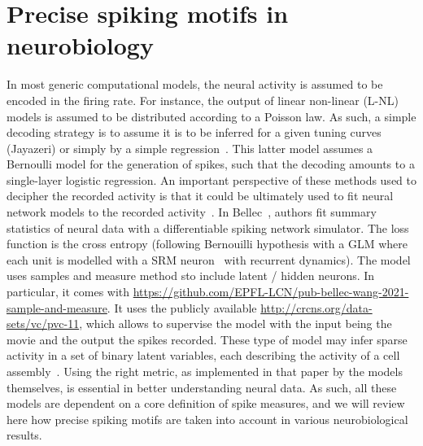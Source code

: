\documentclass[brainsci, %
               review,submit,pdftex,moreauthors
               ]{Definitions/mdpi}
\begin{document}
 \section{Precise spiking motifs in neurobiology}
%
In most generic computational models, the neural activity is assumed to be encoded in the firing rate. For instance, the output of linear non-linear (L-NL) models is assumed to be distributed according to a Poisson law. As such, a simple decoding strategy is to assume it is to be inferred for a given tuning curves (Jayazeri) or simply by a simple regression~\citep{berens_fast_2012}. This latter model assumes a Bernoulli model for the generation of spikes, such that the decoding amounts to a single-layer logistic regression. An important perspective of these methods used to decipher the recorded activity is that it could be ultimately used to fit neural network models to the recorded activity~\citep{bellec_fitting_2021}. In Bellec~\citet{bellec_fitting_2021}, authors fit summary statistics of neural data with a differentiable spiking network simulator. The loss function is the cross entropy (following Bernouilli hypothesis with a GLM where each unit is modelled with a SRM neuron~\citep{gerstner_time_1995} with recurrent dynamics). The model uses samples and measure method sto include latent / hidden neurons. In particular, it comes with  \href{code}{https://github.com/EPFL-LCN/pub-bellec-wang-2021-sample-and-measure}. It uses the publicly available \href{V1-dataset}{http://crcns.org/data-sets/vc/pvc-11}, which allows to supervise the model with the input being the movie and the output the spikes recorded. These type of model may infer sparse activity in a set of binary latent variables, each describing the activity of a cell assembly~\citep{warner_probabilistic_2022}.
Using the right metric, as implemented in that paper by the models themselves, is essential in better understanding neural data. As such, all these models are dependent on  a core definition of spike measures, and we will review here how precise spiking motifs are taken into account in various neurobiological results.
%
\end{document}
